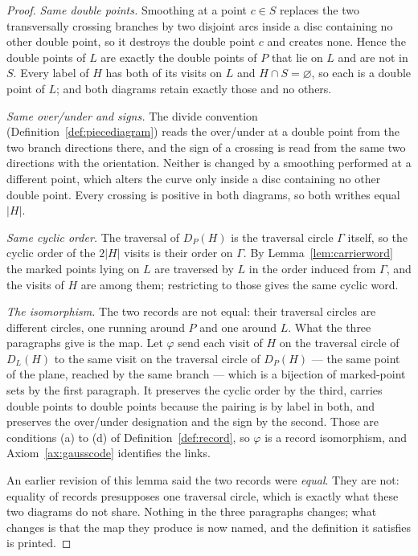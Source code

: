 \begin{proof}
\emph{Same double points.} Smoothing at a point $c\in S$ replaces the two
transversally crossing branches by two disjoint arcs inside a disc containing no
other double point, so it destroys the double point $c$ and creates none. Hence
the double points of $L$ are exactly the double points of $P$ that lie on $L$
and are not in $S$. Every label of $H$ has both of its visits on $L$ and
$H\cap S=\varnothing$, so each is a double point of $L$; and both diagrams
retain exactly those and no others.

\emph{Same over/under and signs.} The divide convention
(Definition~\ref{def:piecediagram}) reads the over/under at a double point from
the two branch directions there, and the sign of a crossing is read from the
same two directions with the orientation. Neither is changed by a smoothing
performed at a different point, which alters the curve only inside a disc
containing no other double point. Every crossing is positive in both diagrams,
so both writhes equal $|H|$.

\emph{Same cyclic order.} The traversal of $D_P(H)$ is the traversal circle
$\Gamma$ itself, so the cyclic order of the $2|H|$ visits is their order on
$\Gamma$. By Lemma~\ref{lem:carrierword} the marked points lying on $L$ are
traversed by $L$ in the order induced from $\Gamma$, and the visits of $H$ are
among them; restricting to those gives the same cyclic word.

\emph{The isomorphism.} The two records are not equal: their traversal circles
are different circles, one running around $P$ and one around $L$. What the three
paragraphs give is the map. Let $\varphi$ send each visit of $H$ on the
traversal circle of $D_L(H)$ to the same visit on the traversal circle of
$D_P(H)$ --- the same point of the plane, reached by the same branch --- which
is a bijection of marked-point sets by the first paragraph. It preserves the
cyclic order by the third, carries double points to double points because the
pairing is by label in both, and preserves the over/under designation and the
sign by the second. Those are conditions (a) to (d) of
Definition~\ref{def:record}, so $\varphi$ is a record isomorphism, and
Axiom~\ref{ax:gausscode} identifies the links.

An earlier revision of this lemma said the two records were \emph{equal}. They
are not: equality of records presupposes
one traversal circle, which is exactly what these two diagrams do not share.
Nothing in the three paragraphs changes; what changes is that the map they
produce is now named, and the definition it satisfies is printed.
\end{proof}

